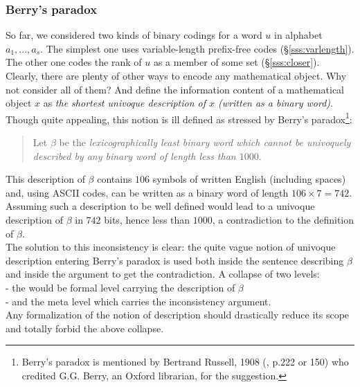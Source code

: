 \subsubsection{Berry's paradox}\label{sss:berry}
So far, we considered two kinds of binary codings for a word
$u$ in alphabet $a_1,...,a_s$.
The simplest one uses variable-length prefix-free codes
(\S\ref{sss:varlength}).
The other one codes the rank of $u$ as a member of some set
(\S\ref{sss:closer}).
\\
Clearly, there are plenty of other ways to encode any
mathematical object.
Why not consider all of them? And define the information
content of a mathematical object $x$ as
{\em the shortest univoque description of $x$ (written as
a binary word)}.
Though quite appealing, this notion is ill defined
as stressed by Berry's paradox\footnote{
Berry's paradox is mentioned by Bertrand Russell, 1908
(\cite{russell}, p.222 or 150) who credited G.G. Berry,
an Oxford librarian, for the suggestion.}:
\begin{quote}
Let $\beta$ be the
{\em lexicographically least binary word which cannot be
univoquely described by any binary word of length less
than $1000$}.
\end{quote}
This description of $\beta$ contains $106$ symbols of written
English (including spaces) and, using ASCII codes,
can be written as a binary word of length $106\times7=742$.
Assuming such a description to be well defined
would lead to a univoque description of $\beta$ in $742 $ bits,
hence less than $1000$,
a contradiction to the definition of $\beta$.
\\
The solution to this inconsistency is clear:
the quite vague notion of univoque description entering
Berry's paradox is used both inside the sentence
describing $\beta$ and inside the argument to get the
contradiction. A collapse of two levels:
\\\indent- the would be formal level carrying the description
           of $\beta$
\\ \indent- and the meta level which carries the inconsistency
            argument.
\\
Any formalization of the notion of description
should drastically reduce its scope and totally forbid
the above collapse.

